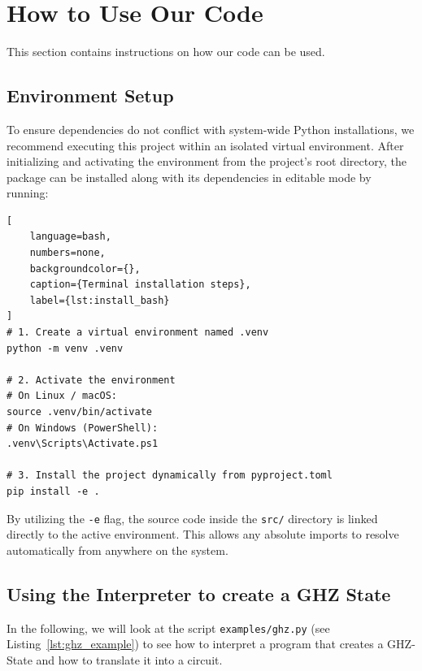 \section{How to Use Our Code}

This section contains instructions on how our code can be used.

\subsection{Environment Setup}
\label{sec:use-env-setup}

To ensure dependencies do not conflict with system-wide Python installations, we recommend executing this project within an isolated virtual environment. 
After initializing and activating the environment from the project's root directory, the package can be installed along with its dependencies in editable mode by running:

\begin{lstlisting}[
    language=bash, 
    numbers=none, 
    backgroundcolor={},
    caption={Terminal installation steps}, 
    label={lst:install_bash}
]
# 1. Create a virtual environment named .venv
python -m venv .venv

# 2. Activate the environment
# On Linux / macOS:
source .venv/bin/activate
# On Windows (PowerShell):
.venv\Scripts\Activate.ps1

# 3. Install the project dynamically from pyproject.toml
pip install -e .
\end{lstlisting}

By utilizing the \texttt{-e} flag, the source code inside the \texttt{src/} directory is linked directly to the active environment. This allows any absolute imports to resolve automatically from anywhere on the system.

\subsection{Using the Interpreter to create a GHZ State}
\label{sec:use-interpreter}

In the following, we will look at the script \texttt{examples/ghz.py} (see Listing~\ref{lst:ghz_example}) to see how to interpret a \bfq{} program that creates a GHZ-State and how to translate it into a \qiskit{} circuit.

